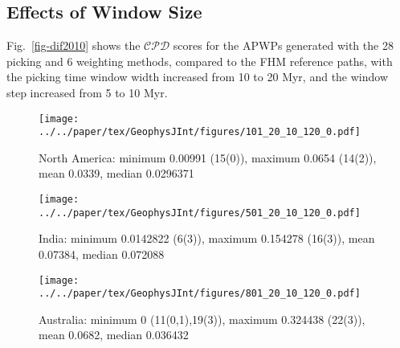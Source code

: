 \subsection{Effects of Window Size}

Fig.~\ref{fig-dif2010} shows the $\mathcal{CPD}$ scores for the APWPs generated
with the 28 picking and 6 weighting methods, compared to the FHM reference
paths, with the picking time window width increased from 10 to 20 Myr, and the
window step increased from 5 to 10 Myr.

\begin{figure*}
	\centering
	\begin{subfigure}{.96\textwidth}
		\texttt{[image: ../../paper/tex/GeophysJInt/figures/101\_20\_10\_120\_0.pdf]}
		\caption{North America: minimum 0.00991 (15(0)),
		maximum 0.0654 (14(2)), mean 0.0339, median 0.0296371}\label{fig-na-dif2010}
	\end{subfigure}
	\vspace{.1em}
	\begin{subfigure}{.96\textwidth}
		\texttt{[image: ../../paper/tex/GeophysJInt/figures/501\_20\_10\_120\_0.pdf]}
		\caption{India: minimum 0.0142822 (6(3)), maximum 0.154278 (16(3)),
		mean 0.07384, median 0.072088}\label{fig-in-dif2010}
	\end{subfigure}
	\vspace{.1em}
	\begin{subfigure}{.96\textwidth}
		\texttt{[image: ../../paper/tex/GeophysJInt/figures/801\_20\_10\_120\_0.pdf]}
		\caption{Australia: minimum 0 (11(0,1),19(3)), maximum
		0.324438 (22(3)), mean 0.0682, median 0.036432}\label{fig-au-dif2010}
	\end{subfigure}
	\caption[$\mathcal{CPD}$ of each plate's paleomagnetic APWPs vs its FHM
predicted APWP (20/10 Myr window/step)]{As Fig.~\ref{fig-dif}, here the paths
are generated in 20 Myr bin and 10 Myr step. The difference values less than
one-standard-deviation interval of the whole 168 values are colored in green,
more than one-standard-deviation interval colored in red. Compare the numbers of
picked paleopoles with those in Fig.~\ref{fig-dif}.}\label{fig-dif2010}
\end{figure*}

